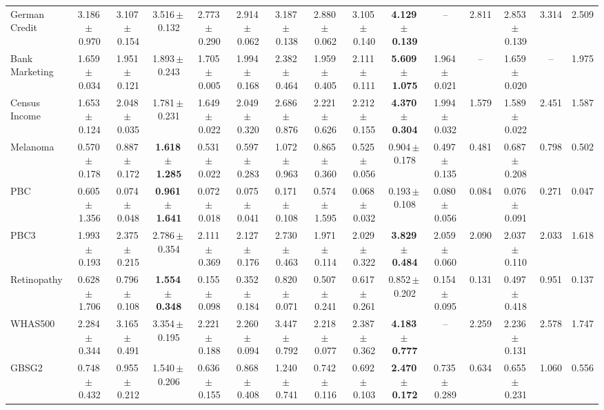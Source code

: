 \documentclass[8pt]{extarticle}
\begin{document}
\begin{longtable}{l*{14}{c}}
German Credit & 3.186\,$\pm$\,0.970 & 3.107\,$\pm$\,0.154 & 3.516\,$\pm$\,0.132 & 2.773\,$\pm$\,0.290 & 2.914\,$\pm$\,0.062 & 3.187\,$\pm$\,0.138 & 2.880\,$\pm$\,0.062 & 3.105\,$\pm$\,0.140 & \textbf{4.129\,$\pm$\,0.139} & -- & 2.811 & 2.853\,$\pm$\,0.139 & 3.314 & 2.509 \\
Bank Marketing & 1.659\,$\pm$\,0.034 & 1.951\,$\pm$\,0.121 & 1.893\,$\pm$\,0.243 & 1.705\,$\pm$\,0.005 & 1.994\,$\pm$\,0.168 & 2.382\,$\pm$\,0.464 & 1.959\,$\pm$\,0.405 & 2.111\,$\pm$\,0.111 & \textbf{5.609\,$\pm$\,1.075} & 1.964\,$\pm$\,0.021 & -- & 1.659\,$\pm$\,0.020 & -- & 1.975 \\
Census Income & 1.653\,$\pm$\,0.124 & 2.048\,$\pm$\,0.035 & 1.781\,$\pm$\,0.231 & 1.649\,$\pm$\,0.022 & 2.049\,$\pm$\,0.320 & 2.686\,$\pm$\,0.876 & 2.221\,$\pm$\,0.626 & 2.212\,$\pm$\,0.155 & \textbf{4.370\,$\pm$\,0.304} & 1.994\,$\pm$\,0.032 & 1.579 & 1.589\,$\pm$\,0.022 & 2.451 & 1.587 \\
Melanoma & 0.570\,$\pm$\,0.178 & 0.887\,$\pm$\,0.172 & \textbf{1.618\,$\pm$\,1.285} & 0.531\,$\pm$\,0.022 & 0.597\,$\pm$\,0.283 & 1.072\,$\pm$\,0.963 & 0.865\,$\pm$\,0.360 & 0.525\,$\pm$\,0.056 & 0.904\,$\pm$\,0.178 & 0.497\,$\pm$\,0.135 & 0.481 & 0.687\,$\pm$\,0.208 & 0.798 & 0.502 \\
PBC & 0.605\,$\pm$\,1.356 & 0.074\,$\pm$\,0.048 & \textbf{0.961\,$\pm$\,1.641} & 0.072\,$\pm$\,0.018 & 0.075\,$\pm$\,0.041 & 0.171\,$\pm$\,0.108 & 0.574\,$\pm$\,1.595 & 0.068\,$\pm$\,0.032 & 0.193\,$\pm$\,0.108 & 0.080\,$\pm$\,0.056 & 0.084 & 0.076\,$\pm$\,0.091 & 0.271 & 0.047 \\
PBC3 & 1.993\,$\pm$\,0.193 & 2.375\,$\pm$\,0.215 & 2.786\,$\pm$\,0.354 & 2.111\,$\pm$\,0.369 & 2.127\,$\pm$\,0.176 & 2.730\,$\pm$\,0.463 & 1.971\,$\pm$\,0.114 & 2.029\,$\pm$\,0.322 & \textbf{3.829\,$\pm$\,0.484} & 2.059\,$\pm$\,0.060 & 2.090 & 2.037\,$\pm$\,0.110 & 2.033 & 1.618 \\
Retinopathy & 0.628\,$\pm$\,1.706 & 0.796\,$\pm$\,0.108 & \textbf{1.554\,$\pm$\,0.348} & 0.155\,$\pm$\,0.098 & 0.352\,$\pm$\,0.184 & 0.820\,$\pm$\,0.071 & 0.507\,$\pm$\,0.241 & 0.617\,$\pm$\,0.261 & 0.852\,$\pm$\,0.202 & 0.154\,$\pm$\,0.095 & 0.131 & 0.497\,$\pm$\,0.418 & 0.951 & 0.137 \\
WHAS500 & 2.284\,$\pm$\,0.344 & 3.165\,$\pm$\,0.491 & 3.354\,$\pm$\,0.195 & 2.221\,$\pm$\,0.188 & 2.260\,$\pm$\,0.094 & 3.447\,$\pm$\,0.792 & 2.218\,$\pm$\,0.077 & 2.387\,$\pm$\,0.362 & \textbf{4.183\,$\pm$\,0.777} & -- & 2.259 & 2.236\,$\pm$\,0.131 & 2.578 & 1.747 \\
GBSG2 & 0.748\,$\pm$\,0.432 & 0.955\,$\pm$\,0.212 & 1.540\,$\pm$\,0.206 & 0.636\,$\pm$\,0.155 & 0.868\,$\pm$\,0.408 & 1.240\,$\pm$\,0.741 & 0.742\,$\pm$\,0.116 & 0.692\,$\pm$\,0.103 & \textbf{2.470\,$\pm$\,0.172} & 0.735\,$\pm$\,0.289 & 0.634 & 0.655\,$\pm$\,0.231 & 1.060 & 0.556 \\

\end{longtable}
\end{document}
